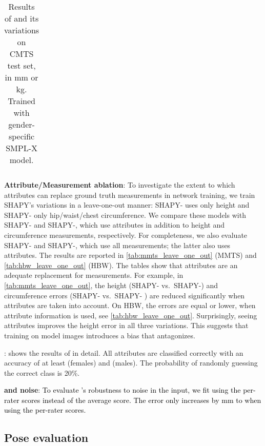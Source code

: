 \documentclass[10pt,twocolumn,letterpaper]{article}
\newcommand{\qheading}[1]{\noindent\textbf{#1}:}
\newcommand{\TODO}[1]{\xspace{\color{red} #1}\xspace}
\renewcommand{\TODO}[1]{\xspace{\color{black} #1}\xspace}
\newcommand{\modelCOLOR}{black}
\newcommand{\modelname}{{\color{\modelCOLOR}SHAPY}\xspace}
\newcommand{\colorattr}{\color{PineGreen}}
\newcommand{\colorheight}{\color{Bittersweet}}
\newcommand{\colorweight}{\color{Orange}}
\newcommand{\colorcirc}{\color{OrangeRed}}
\newcommand{\colorAHWCtoS}{\text{\mbox{{\colorattr{A}}{\colorheight{H}}{\colorweight{W}}{\colorcirc{C}}}}\xspace}
\newcommand{\colorAHWC}{\text{\mbox{{\colorattr{A}}{\colorheight{H}}{\colorweight{W}}{\colorcirc{C}}2S}}\xspace}
\newcommand{\colorAH}{\text{\mbox{{\colorattr{A}}{\colorheight{H}}}}\xspace}
\newcommand{\AtoS}{\text{\mbox{A2S}}\xspace}
\newcommand{\StoA}{\text{\mbox{S2A}}\xspace}
\newcommand{\mmts}{MMTS\xspace}
\newcommand{\cmts}{CMTS\xspace}
\newcommand{\vspaceTABaboveCaption}{-0.0 em}
\newcommand{\hbw}{\mbox{HBW}\xspace}
\newcommand{\smplx}{\mbox{SMPL-X}\xspace}
\newcommand{\vtovHD}{\mbox{}\xspace}
\newcommand{\cameraready}[1]{\textcolor{Fuchsia}{{#1}}\xspace}
\renewcommand{\cameraready}[1]{\textcolor{black}{{#1}}\xspace}
\begin{document}
\begin{appendices}
\begin{table}
{\begin{tabular}{llllllll}
            \bottomrule
        \end{tabular}
    }
    \vspace{\vspaceTABaboveCaption}
    \caption{
        Results of \AtoS and its variations on \cmts test set, in mm or kg. Trained with gender-specific \smplx model.
    }
    \label{supmat:tab:a2s_quant_result_cmts}
\end{table} 
\qheading{Attribute/Measurement ablation}
To investigate the extent to which attributes can replace ground truth measurements
in network training, we train \modelname's variations in a leave-one-out manner:
{\modelname-\colorheight{H}} uses only height and \modelname-{\colorcirc{C}}
only hip/waist/chest circumference.
We compare these models with \modelname-{\colorattr{A}}{\colorheight{H}} and
\modelname-{\colorattr{A}}{\colorcirc{C}},
which use attributes in addition to height and circumference measurements,
respectively. For completeness, we also evaluate
\modelname-{\colorheight{H}}{\colorcirc{C}}
and \modelname-{\colorattr{A}}{\colorheight{H}}{\colorcirc{C}},
which use all measurements; the latter also uses attributes.
The results are reported in \cref{tab:mmts_leave_one_out} (\mmts) and \cref{tab:hbw_leave_one_out} (\hbw).
\TODO{The tables show that attributes are an adequate replacement for measurements.
For example, in \cref{tab:mmts_leave_one_out}, the height
(\modelname-{\colorcirc{C}} vs.~\modelname-{\colorcirc{C}}{\colorattr{A}})
and circumference errors
(\modelname-{\colorheight{H}} vs.~\modelname-\colorAH
) are reduced significantly
when attributes are taken into account. On \hbw, the \vtovHD errors are equal or lower,
when attribute information is used, see \cref{tab:hbw_leave_one_out}.
Surprisingly, seeing attributes improves the height error in all three variations.
This suggests that training on model images introduces a bias that \AtoS antagonizes.
}

\qheading{\StoA}
 shows the results of \StoA in detail. \TODO{All attributes are classified correctly with an accuracy of at least  (females) and  (males). The probability of randomly guessing the correct class is 20\%.}


\qheading{\colorAHWCtoS and \colorAHWC noise}
\cameraready{To evaluate \colorAHWCtoS's robustness to noise in the input,
    we fit \colorAHWCtoS using the per-rater scores instead
    of the average score. The \vtovHD  error only increases
    by  mm to  when using the per-rater scores.
}
\subsection{Pose evaluation}
\label{sec:pose_eval}


\end{appendices}
\end{document}
